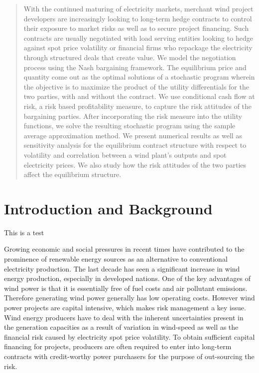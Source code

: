 \begin{abstract}
With the continued maturing of electricity markets, merchant wind project developers are increasingly looking to long-term hedge contracts to control their exposure to market risks as well as to secure project financing.  Such contracts are usually negotiated with load serving entities looking to hedge against spot price volatility or financial firms who repackage the electricity through structured deals that create value. We model the negotiation process using the Nash bargaining framework. The equilibrium price and quantity come out as the optimal solutions of a stochastic program wherein the objective is to maximize the product of the utility differentials for the two parties, with and without the contract. We use conditional cash flow at risk, a risk based profitability measure, to capture the risk attitudes of the bargaining parties. After incorporating the risk measure into the utility functions, we solve the resulting stochastic program using the sample average approximation method. We present numerical results as well as sensitivity analysis for the equilibrium contract structure with respect to volatility and correlation between a wind plant's outputs and spot electricity prices. We also study how the risk attitudes of the two parties affect the equilibrium structure.
\end{abstract}

\section{Introduction and Background}

This is a test 

\noindent Growing economic and social pressures in recent times have contributed to the prominence of renewable energy sources as an alternative to conventional electricity production. The last decade has seen a significant increase in wind energy production, especially in developed nations. One of the key advantages of wind power is that it is essentially free of fuel costs and air pollutant emissions. Therefore generating wind power generally has low operating costs. However wind power projects are capital intensive, which makes risk management a key issue. Wind energy producers have to deal with the inherent uncertainties present in the generation capacities as a result of variation in wind-speed as well as the financial risk caused by electricity spot price volatility. To obtain sufficient capital financing for projects, producers are often required to enter into long-term contracts with credit-worthy power purchasers for the purpose of out-sourcing the risk.\\

